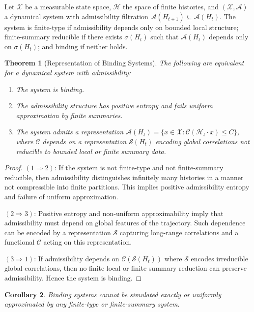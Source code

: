 \documentclass[12pt, a4paper]{article}
\theoremstyle{plain}
\newtheorem{theorem}{Theorem}[section]
\newtheorem{corollary}[theorem]{Corollary}
\theoremstyle{definition}
\theoremstyle{remark}
\begin{document}
Let $\mathcal{X}$ be a measurable state space, $\mathcal{H}$ the space of finite histories, and $(\mathcal{X}, \mathcal{A})$ a dynamical system with admissibility filtration $\mathcal{A}(H_{t+1}) \subseteq \mathcal{A}(H_t)$. The system is finite-type if admissibility depends only on bounded local structure; finite-summary reducible if there exists $\sigma(H_t)$ such that $\mathcal{A}(H_t)$ depends only on $\sigma(H_t)$; and binding if neither holds.

\begin{theorem}[Representation of Binding Systems]
The following are equivalent for a dynamical system with admissibility:
\begin{enumerate}
\item The system is binding.
\item The admissibility structure has positive entropy and fails uniform approximation by finite summaries.
\item The system admits a representation $\mathcal{A}(H_t) = \{x \in \mathcal{X} : \mathcal{C}(\mathcal{H}_t \cdot x) \le C\}$, where $\mathcal{C}$ depends on a representation $\mathcal{S}(H_t)$ encoding global correlations not reducible to bounded local or finite summary data.
\end{enumerate}
\end{theorem}

\begin{proof}
$(1 \Rightarrow 2)$: If the system is not finite-type and not finite-summary reducible, then admissibility distinguishes infinitely many histories in a manner not compressible into finite partitions. This implies positive admissibility entropy and failure of uniform approximation.

$(2 \Rightarrow 3)$: Positive entropy and non-uniform approximability imply that admissibility must depend on global features of the trajectory. Such dependence can be encoded by a representation $\mathcal{S}$ capturing long-range correlations and a functional $\mathcal{C}$ acting on this representation.

$(3 \Rightarrow 1)$: If admissibility depends on $\mathcal{C}(\mathcal{S}(H_t))$ where $\mathcal{S}$ encodes irreducible global correlations, then no finite local or finite summary reduction can preserve admissibility. Hence the system is binding.
\end{proof}

\begin{corollary}
Binding systems cannot be simulated exactly or uniformly approximated by any finite-type or finite-summary system.
\end{corollary}
\end{document}
